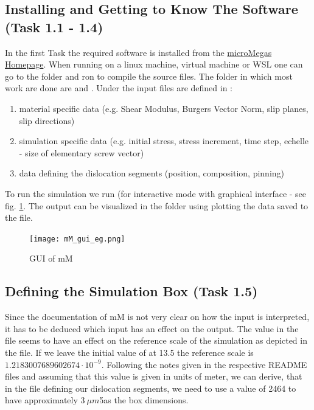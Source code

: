 \subsection{Installing and Getting to Know The Software (Task 1.1 - 1.4)}
In the first Task the required software is installed from the \href{http://zig.onera.fr/mm_home_page/}{microMegas Homepage}. When running on a linux machine, virtual machine or WSL one can go to the  folder and ron  to compile the source files. The folder in which most work are done are  and . Under  the input files are defined in :

\begin{enumerate}
	\item material specific data (e.g. Shear Modulus, Burgers Vector Norm, slip planes, slip directions)
	\item simulation specific data (e.g. initial stress, stress increment, time step, echelle - size of elementary screw vector)
	\item data defining the dislocation segments (position, composition, pinning)
\end{enumerate}

To run the simulation we run  (for interactive mode with graphical interface - see fig. \ref{fig:mm_gui}. The output can be visualized in the  folder using plotting the data saved to the  file.

\begin{figure}[htb]
	\centering
	\texttt{[image: mM\_gui\_eg.png]}
	\caption{GUI of mM}
	\label{fig:mm_gui}
\end{figure}

\subsection{Defining the Simulation Box (Task 1.5)}

Since the documentation of mM is not very clear on how the input is interpreted, it has to be deduced which input has an effect on the output. The  value in the  file seems to have an effect on the reference scale of the simulation as depicted in the  file. If we leave the initial value of  at 13.5 the reference scale is \(1.2183007689602674 \cdot 10^{-9}\). Following the notes given in the respective README files and assuming that this value is given in units of meter, we can derive, that in the file defining our dislocation segments, we need to use a value of 2464 to have approximately \(3~\mu m\)5as the box dimensions.

